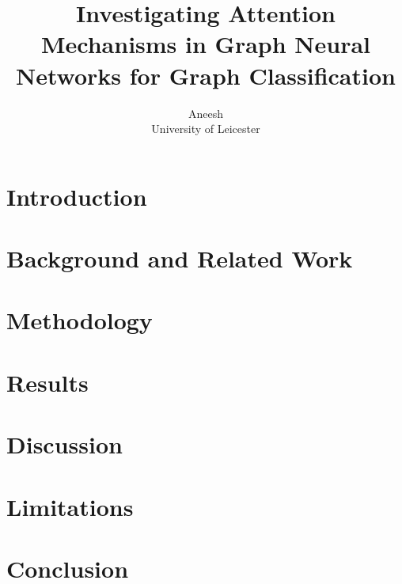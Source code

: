 \documentclass[11pt,a4paper]{article}
\title{Investigating Attention Mechanisms in Graph Neural Networks
for Graph Classification}
\author{Aneesh\\University of Leicester}
\date{}
\begin{document}
\maketitle

\begin{abstract}
\end{abstract}

\section{Introduction}

\section{Background and Related Work}

\section{Methodology}

\section{Results}

\section{Discussion}

\section{Limitations}

\section{Conclusion}

\nocite{kipf2017gcn,velickovic2018gat}



\end{document}
